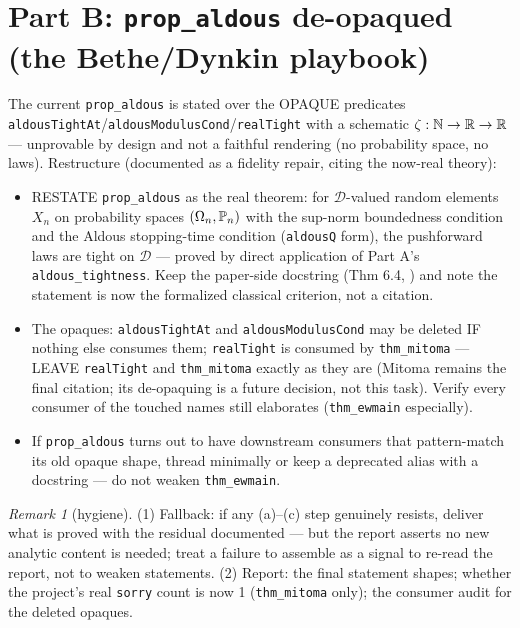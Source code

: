\documentclass[11pt]{article}
\theoremstyle{plain}
\theoremstyle{remark}
\newtheorem{remark}{Remark}
\newcommand{\D}{\mathcal D}\newcommand{\eps}{\varepsilon}
\begin{document}
\section*{Part B: \texttt{prop\_aldous} de-opaqued (the Bethe/Dynkin
playbook)}

The current \texttt{prop\_aldous} is stated over the OPAQUE predicates
\texttt{aldousTightAt}/\texttt{aldousModulusCond}/\texttt{realTight} with a
schematic $\zeta:\mathbb N\to\mathbb{R}\to\mathbb{R}$ --- unprovable by design and not a
faithful rendering (no probability space, no laws). Restructure (documented
as a fidelity repair, citing the now-real theory):
\begin{itemize}
\item[(d)] RESTATE \texttt{prop\_aldous} as the real theorem: for
$\D$-valued random elements $X_n$ on probability spaces
$(\Omega_n,\mathbb{P}_n)$ with the sup-norm boundedness condition and the Aldous
stopping-time condition (\texttt{aldousQ} form), the pushforward laws are
tight on $\D$ --- proved by direct application of Part A's
\texttt{aldous\_tightness}. Keep the paper-side docstring (Thm 6.4,
\cite{Aldous}) and note the statement is now the formalized classical
criterion, not a citation.
\item[(e)] The opaques: \texttt{aldousTightAt} and
\texttt{aldousModulusCond} may be deleted IF nothing else consumes them;
\texttt{realTight} is consumed by \texttt{thm\_mitoma} --- LEAVE
\texttt{realTight} and \texttt{thm\_mitoma} exactly as they are (Mitoma
remains the final citation; its de-opaquing is a future decision, not this
task). Verify every consumer of the touched names still elaborates
(\texttt{thm\_ewmain} especially).
\item[(f)] If \texttt{prop\_aldous} turns out to have downstream consumers
that pattern-match its old opaque shape, thread minimally or keep a
deprecated alias with a docstring --- do not weaken \texttt{thm\_ewmain}.
\end{itemize}

\begin{remark}[hygiene]
(1) Fallback: if any (a)--(c) step genuinely resists, deliver what is proved
with the residual documented --- but the report asserts no new analytic
content is needed; treat a failure to assemble as a signal to re-read the
report, not to weaken statements.
(2) Report: the final statement shapes; whether the project's real
\texttt{sorry} count is now 1 (\texttt{thm\_mitoma} only); the consumer
audit for the deleted opaques.
\end{remark}
\end{document}
